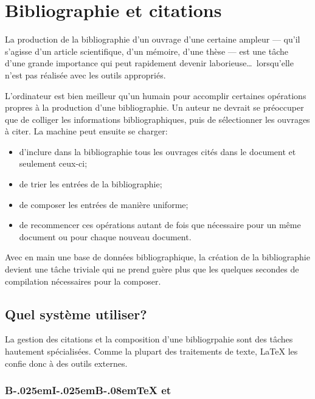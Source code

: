 \chapter{Bibliographie et citations}
\label{chap:bibliographie}

\nobibliography*

La production de la bibliographie d'un ouvrage d'une certaine ampleur
--- qu'il s'agisse d'un article scientifique, d'un mémoire, d'une
thèse --- est une tâche d'une grande importance qui peut rapidement devenir
laborieuse\dots\ lorsqu'elle n'est pas réalisée avec les outils appropriés.

L'ordinateur est bien meilleur qu'un humain pour accomplir certaines
opérations propres à la production d'une bibliographie. Un auteur ne
devrait se préoccuper que de colliger les informations
bibliographiques, puis de sélectionner les ouvrages à citer. La
machine peut ensuite se charger:
\begin{itemize}
\item d'inclure dans la bibliographie tous les ouvrages cités dans le
  document et seulement ceux-ci;
\item de trier les entrées de la bibliographie;
\item de composer les entrées de manière uniforme;
\item de recommencer ces opérations autant de fois que nécessaire pour
  un même document ou pour chaque nouveau document.
\end{itemize}
Avec en main une base de données bibliographique, la création de la
bibliographie devient une tâche triviale qui ne prend guère plus que
les quelques secondes de compilation nécessaires pour la composer.


\section{Quel système utiliser?}
\label{sec:bibliographie:systeme}

La gestion des citations et la composition d'une bibliogrpahie sont
des tâches hautement spécialisées. Comme la plupart des traitements de
texte, {\LaTeX} les confie donc à des outils externes.

\subsection[{\BibTeX} et \pkg{natbib}]{%
  {B\kern-.025em{\small I}\kern-.025em{\small  B}\kern-.08em\TeX} %
  et }
\label{sec:bibliographie:systeme:bibtex}

